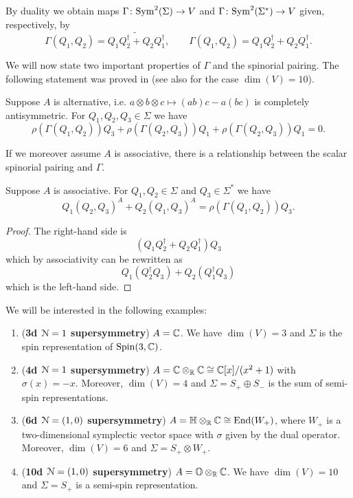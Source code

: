 \documentclass[10pt, oneside]{article}
\begin{document}
By duality we obtain maps $\Gamma\colon{\rm Sym}^2(\Sigma)\rightarrow V$ and $\Gamma\colon {\rm Sym}^2(\Sigma^*)\rightarrow V$ given, respectively, by
\[\Gamma(Q_1, Q_2) = \widetilde{Q_1Q_2^\dagger + Q_2Q_1^\dagger},\qquad \Gamma(Q_1, Q_2) = Q_1Q_2^\dagger + Q_2Q_1^\dagger.\]

We will now state two important properties of $\Gamma$ and the spinorial pairing. The following statement was proved in \cite[Theorem 11]{BaezHuerta} (see also \cite{Schray} for the case $\dim(V)=10$).

\begin{theorem}
Suppose $A$ is alternative, i.e. $a\otimes b\otimes c\mapsto (ab)c - a(bc)$ is completely antisymmetric. For $Q_1, Q_2, Q_3\in\Sigma$ we have
\[\rho(\Gamma(Q_1, Q_2))Q_3 + \rho(\Gamma(Q_2, Q_3))Q_1 + \rho(\Gamma(Q_2, Q_3))Q_1 = 0.\]
\label{thm:3psi}
\end{theorem}

If we moreover assume $A$ is associative, there is a relationship between the scalar spinorial pairing and $\Gamma$.

\begin{theorem}
Suppose $A$ is associative. For $Q_1, Q_2\in\Sigma$ and $Q_3\in\Sigma^*$ we have
\[Q_1(Q_2, Q_3)^A + Q_2(Q_1, Q_3)^A = \rho(\Gamma(Q_1, Q_2)) Q_3.\]
\label{thm:matter3psi}
\end{theorem}
\begin{proof}
The right-hand side is
\[(Q_1Q_2^\dagger + Q_2Q_1^\dagger)Q_3\]
which by associativity can be rewritten as
\[Q_1(Q_2^\dagger Q_3) + Q_2(Q_1^\dagger Q_3)\]
which is the left-hand side.
\end{proof}

We will be interested in the following examples:
\begin{enumerate}
\item (\textbf{3d $\mathcal{N}=1$ supersymmetry}) $A = \mathbb C$. We have $\dim(V) = 3$ and $\Sigma$ is the spin representation of $\mathrm{Spin}(3, \mathbb C)$.

\item (\textbf{4d $\mathcal{N}=1$ supersymmetry}) $A = \mathbb C\otimes_{\mathbb R}\mathbb C\cong \mathbb C[x]/(x^2+1)$ with $\sigma(x) = -x$. Moreover, $\dim(V) = 4$ and $\Sigma=S_+\oplus S_-$ is the sum of semi-spin representations.

\item (\textbf{6d $\mathcal{N}=(1, 0)$ supersymmetry}) $A=\mathbb{H}\otimes_{\mathbb R}\mathbb C\cong \operatorname{End}(W_+)$, where $W_+$ is a two-dimensional symplectic vector space with $\sigma$ given by the dual operator. Moreover, $\dim(V) = 6$ and $\Sigma = S_+\otimes W_+$.

\item (\textbf{10d $\mathcal{N}=(1, 0)$ supersymmetry}) $A=\mathbb{O}\otimes_{\mathbb R}\mathbb C$. We have $\dim(V) = 10$ and $\Sigma = S_+$ is a semi-spin representation.
\end{enumerate}
\end{document}
